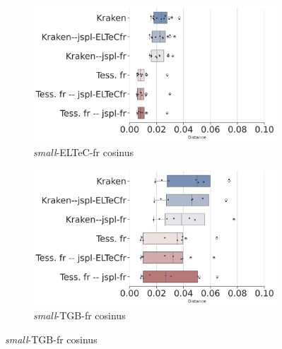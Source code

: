 \begin{figure}[h!]
   \centering
      \begin{subfigure}{0.45\textwidth}
      \hspace{-0.75cm}
  \includegraphics[height=.58\textwidth]{REVUETAL_article_23102023/IMAGES/Boite-a_moustache_12072024/ELTeC_fra_spaCy3.5.1/ELTeC_fra_spaCy3.5.1-cosinus-sim2-3.png} 
        \caption{\textit{small}-ELTeC-fr cosinus}
        \label{fig:ELTeC-Fra_REF_cosinus}
   \end{subfigure}
       \begin{subfigure}{0.45\textwidth}
  \includegraphics[height=.58\textwidth]{REVUETAL_article_23102023/IMAGES/Boite-a_moustache_12072024/TGB_spaCy3.5.1/DATA_TGB-2023_spaCy3.5.1_Distance-cosinus-sim2-3.png} 
        \caption{\textit{small}-TGB-fr cosinus}
        \label{fig:small-TGB_REF_cosinus}
   \end{subfigure}
   

\end{figure}
